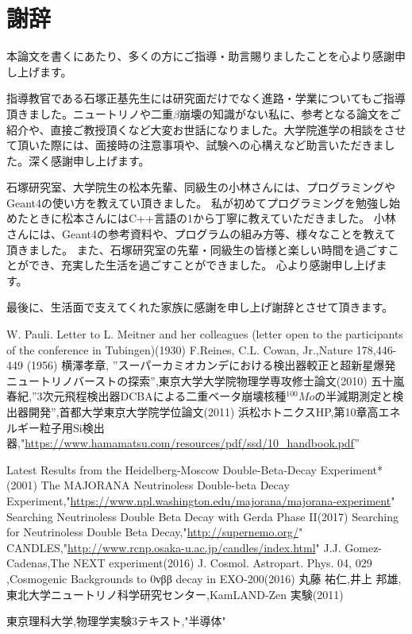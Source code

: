 \documentclass[a4paper,10pt]{jreport}
\begin{document}
\chapter*{謝辞}

本論文を書くにあたり、多くの方にご指導・助言賜りましたことを心より感謝申し上げます。

指導教官である石塚正基先生には研究面だけでなく進路・学業についてもご指導頂きました。ニュートリノや二重$\beta$崩壊の知識がない私に、参考となる論文をご紹介や、直接ご教授頂くなど大変お世話になりました。大学院進学の相談をさせて頂いた際には、面接時の注意事項や、試験への心構えなど助言いただきました。深く感謝申し上げます。

石塚研究室、大学院生の松本先輩、同級生の小林さんには、プログラミングやGeant4の使い方を教えてい頂きました。
私が初めてプログラミングを勉強し始めたときに松本さんにはC++言語の1から丁寧に教えていただきました。
小林さんには、Geant4の参考資料や、プログラムの組み方等、様々なことを教えて頂きました。
また、石塚研究室の先輩・同級生の皆様と楽しい時間を過ごすことができ、充実した生活を過ごすことができました。
心より感謝申し上げます。

最後に、生活面で支えてくれた家族に感謝を申し上げ謝辞とさせて頂きます。




\begin{thebibliography}{9}
 W. Pauli. Letter to L. Meitner and her colleagues (letter open to the participants of the conference in Tubingen)(1930)
 F.Reines, C.L. Cowan, Jr.,Nature 178,446-449 (1956)
 横澤孝章, ''スーパーカミオカンデにおける検出器較正と超新星爆発ニュートリノバーストの探索'',東京大学大学院物理学専攻修士論文(2010)
五十嵐春紀,''3次元飛程検出器DCBAによる二重ベータ崩壊核種$^{100}Mo$の半減期測定と検出器開発'',首都大学東京大学院学位論文(2011)
浜松ホトニクスHP,第10章高エネルギー粒子用Si検出器,"\url{https://www.hamamatsu.com/resources/pdf/ssd/10_handbook.pdf}''

Latest Results from the Heidelberg-Moscow Double-Beta-Decay Experiment*(2001)
The MAJORANA Neutrinoless Double-beta Decay Experiment,"\url{https://www.npl.washington.edu/majorana/majorana-experiment}"
Searching Neutrinoless Double Beta Decay with Gerda Phase II(2017)
Searching for Neutrinoless Double Beta Decay,"\url{http://supernemo.org/}"
CANDLES,"\url{http://www.rcnp.osaka-u.ac.jp/candles/index.html}"
J.J. Gomez-Cadenas,The NEXT experiment(2016)
J. Cosmol. Astropart. Phys. 04, 029 ,Cosmogenic Backgrounds to 0νββ decay in EXO-200(2016)
丸藤 祐仁,井上 邦雄,東北大学ニュートリノ科学研究センター,KamLAND-Zen 実験(2011)

東京理科大学,物理学実験3テキスト,"半導体"
\end{thebibliography}
\end{document}
